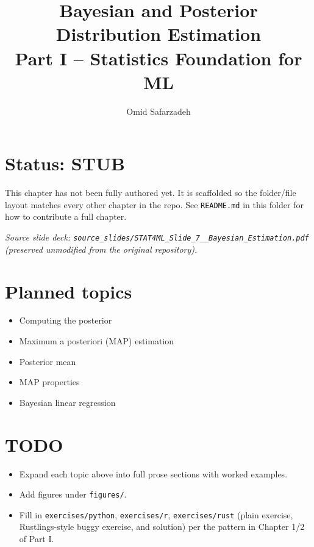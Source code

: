 \documentclass[11pt]{article}
\title{Bayesian and Posterior Distribution Estimation \\ \large Part I -- Statistics Foundation for ML}
\author{Omid Safarzadeh}
\date{}
\begin{document}
\maketitle

\section*{Status: STUB}
This chapter has not been fully authored yet. It is scaffolded so the
folder/file layout matches every other chapter in the repo. See
\texttt{README.md} in this folder for how to contribute a full chapter.

\textit{Source slide deck: \texttt{source\_slides/STAT4ML\_Slide\_7\_\_Bayesian\_Estimation.pdf} (preserved unmodified from the original repository).}



\section*{Planned topics}
\begin{itemize}
  \item Computing the posterior
  \item Maximum a posteriori (MAP) estimation
  \item Posterior mean
  \item MAP properties
  \item Bayesian linear regression
\end{itemize}

\section*{TODO}
\begin{itemize}
  \item Expand each topic above into full prose sections with worked examples.
  \item Add figures under \texttt{figures/}.
  \item Fill in \texttt{exercises/python}, \texttt{exercises/r}, \texttt{exercises/rust}
        (plain exercise, Rustlings-style buggy exercise, and solution) per the
        pattern in Chapter 1/2 of Part I.
\end{itemize}
\end{document}
